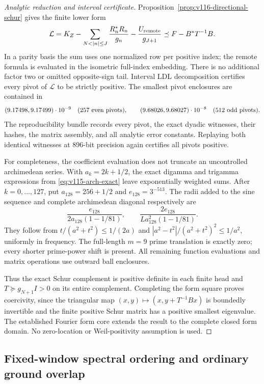 \documentclass[11pt]{article}
\theoremstyle{remark}
\begin{document}
\begin{proof}[Analytic reduction and interval certificate]
Proposition~\ref{prop:v116-directional-schur} gives the finite lower form
\begin{equation}\label{eq:v116-certified-lower}
 \mathcal L=K_Z-
 \sum_{N<|n|\le J}\frac{R_n^*R_n}{g_n}
 -\frac{U_{\rm remote}}{g_{J+1}}
 \preceq F-B^*T^{-1}B.
\end{equation}
In a parity basis the sum uses one normalized row per positive index;
the remote formula is evaluated in the isometric full-index embedding.
There is no additional factor two or omitted opposite-sign tail.
Interval LDL decomposition certifies every pivot of $\mathcal L$ to
be strictly positive. The smallest pivot enclosures are contained in
\[
 (9.17498,9.17499)\cdot10^{-9}\quad\hbox{(257 even pivots)},
 \qquad
 (9.68026,9.68027)\cdot10^{-8}\quad\hbox{(512 odd pivots)}.
\]
The reproducibility bundle records every pivot, the exact dyadic
witnesses, their hashes, the matrix assembly, and all analytic error
constants. Replaying both identical witnesses at 896-bit precision
again certifies all pivots positive.

For completeness, the coefficient evaluation does not truncate an
uncontrolled archimedean series. With $a_k=2k+1/2$, the exact
digamma and trigamma expressions from
\eqref{eq:v115-arch-exact} leave exponentially weighted sums.
After $k=0,\ldots,127$, put $a_{128}=256+1/2$ and
$e_{128}=3^{-513}$. The radii added to the sine sequence and
complete archimedean diagonal respectively are
\[
 \frac{e_{128}}{2a_{128}(1-1/81)},\qquad
 \frac{2e_{128}}{La_{128}^2(1-1/81)}.
\]
They follow from $t/(a^2+t^2)\le1/(2a)$ and
$|a^2-t^2|/(a^2+t^2)^2\le1/a^2$, uniformly in frequency.
The full-length $m=9$ prime translation is exactly zero; every
shorter prime-power shift is present. All remaining function evaluations
and matrix operations use outward ball enclosures.

Thus the exact Schur complement is positive definite in each finite
head and $T\succeq g_{N+1}I>0$ on its entire complement. Completing
the form square proves coercivity, since the triangular map
$(x,y)\mapsto(x,y+T^{-1}Bx)$ is boundedly invertible and the finite
positive Schur matrix has a positive smallest eigenvalue. The established
Fourier form core extends the result to the complete closed form domain.
No zero-location or Weil-positivity assumption is used.
\end{proof}

\subsection*{Fixed-window spectral ordering and ordinary ground overlap}
\end{document}

